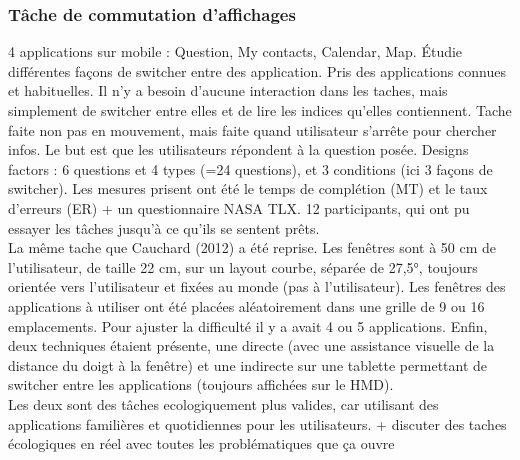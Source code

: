 \subsubsection{Tâche de commutation d'affichages}
4 applications sur mobile : Question, My contacts, Calendar, Map. Étudie différentes façons de switcher entre des application. Pris des applications connues et habituelles. Il n'y a besoin d'aucune interaction dans les taches, mais simplement de switcher entre elles et de lire les indices qu'elles contiennent. Tache faite non pas en mouvement, mais faite quand utilisateur s'arrête pour chercher infos. Le but est que les utilisateurs répondent à la question posée. Designs factors : 6 questions et 4 types (=24 questions), et 3 conditions (ici 3 façons de switcher). Les mesures prisent ont été le temps de complétion (MT) et le taux d'erreurs (ER) + un questionnaire NASA TLX. 12 participants, qui ont pu essayer les tâches jusqu'à ce qu'ils se sentent prêts. \cite{CauchardLoechtefeldFraserEtAl2012}\\
La même tache que Cauchard (2012) a été reprise. Les fenêtres sont à 50 cm de l'utilisateur, de taille 22 cm, sur un layout courbe, séparée de 27,5°, toujours orientée vers l'utilisateur et fixées au monde (pas à l'utilisateur). Les fenêtres des applications à utiliser ont été placées aléatoirement dans une grille de 9 ou 16 emplacements. Pour ajuster la difficulté il y a avait 4 ou 5 applications. Enfin, deux techniques étaient présente, une directe (avec une assistance visuelle de la distance du doigt à la fenêtre) et une indirecte sur une tablette permettant de switcher entre les applications (toujours affichées sur le HMD). \cite{EnsFinneganIrani2014}\\
Les deux sont des tâches ecologiquement plus valides, car utilisant des applications familières et quotidiennes pour les utilisateurs. + discuter  des taches écologiques en réel avec toutes les problématiques que ça ouvre \cite{KoelleKranzMoeller2015} \cite{DenningDehlawiKohno2014}




